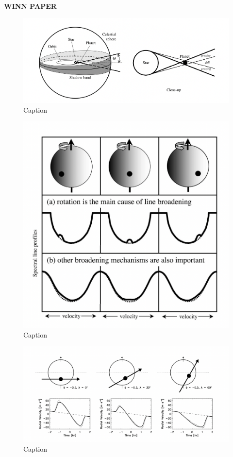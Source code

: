 \documentclass[oneside,12pt]{amsart}
\numberwithin{page}{section}
\begin{document}
\clearpage


\textbf{WINN PAPER}

\begin{figure}
    \centering
    \includegraphics[width=0.5\linewidth]{figs/winn_fig3.png}
    \caption{Caption}
    \label{fig:enter-label}
\end{figure}

\begin{figure}
    \centering
    \includegraphics[width=0.5\linewidth]{figs/winn_fig5.png}
    \caption{Caption}
    \label{fig:enter-label}
\end{figure}

\begin{figure}
    \centering
    \includegraphics[width=0.5\linewidth]{figs/winn_fig6.png}
    \caption{Caption}
    \label{fig:enter-label}
\end{figure}
\end{document}
